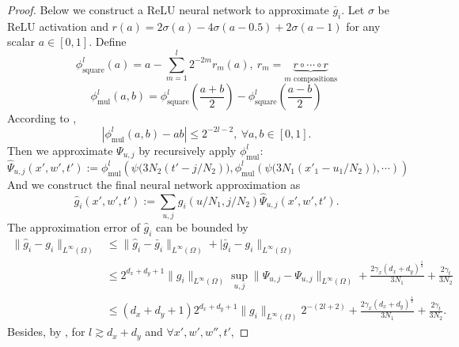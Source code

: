 \documentclass{article}
\numberwithin{equation}{section}
\theoremstyle{definition}
\begin{document}
\begin{proof}
    Below we construct a ReLU neural network to approximate $\bar{g}_i$.
    Let $\sigma$ be ReLU activation and $r(a)=2\sigma(a)-4\sigma(a-0.5)+2\sigma(a-1)$ for any scalar $a\in[0,1]$.
    Define
    \begin{equation}
        \phi_{\text{square}}^l(a)=a-\sum_{m=1}^l2^{-2m}r_m(a),\ r_m=\underbrace{r\circ\cdots\circ r}_{m \text{ compositions}}
    \end{equation}
    \begin{equation}
        \phi_{\text{mul}}^l(a,b)=\phi_{\text{square}}^l(\frac{a+b}{2})-\phi_{\text{square}}^l(\frac{a-b}{2})
    \end{equation}
    According to \citet{yarotsky2017error}, 
    \begin{equation}
        |\phi_{\text{mul}}^l(a,b)-ab|\leq 2^{-2l-2},\ \forall a,b\in[0,1].
    \end{equation}
    Then we approximate $\Psi_{u,j}$ by recursively apply $\phi_{\text{mul}}^l$:
    \begin{equation}\label{eq:def_Psi_hat}
        \widehat{\Psi}_{u,j}(x',w',t'):=\phi_{\text{mul}}^l\left(\psi\big(3N_2(t'-j/N_2)\big),\phi_{\text{mul}}^l\left(\psi\big(3N_1(x'_1-u_1/N_2)\big),\cdots\right)\right)
    \end{equation}
    And we construct the final neural network approximation as
    \begin{equation}\label{eq:def_g_hat}
        \widehat{g}_i(x',w',t'):=\sum_{u,j}g_i(u/N_1,j/N_2)\widehat{\Psi}_{u,j}(x',w',t').
    \end{equation}
    The approximation error of $\widehat{g}_i$ can be bounded by
    \begin{equation}
        \begin{aligned}
            \|\widehat{g}_i-g_i\|_{L^\infty(\Omega)}
            &\leq \|\widehat{g}_i-\bar{g}_i\|_{L^\infty(\Omega)}+|\bar{g}_i-g_i\|_{L^\infty(\Omega)} \\
            &\leq 2^{d_x+d_y+1}\|g_i\|_{L^\infty(\Omega)}\sup_{u,j}\|\widehat{\Psi}_{u,j}-\Psi_{u,j}\|_{L^\infty(\Omega)}+\frac{2\gamma_x(d_x+d_y)^{\frac{1}{2}}}{3N_1}+\frac{2\gamma_t}{3N_2} \\
            &\leq (d_x+d_y+1)2^{d_x+d_y+1}\|g_i\|_{L^\infty(\Omega)}2^{-(2l+2)}+\frac{2\gamma_x(d_x+d_y)^{\frac{1}{2}}}{3N_1}+\frac{2\gamma_t}{3N_2}.
        \end{aligned}
    \end{equation}
    Besides, by \citet[Lemma 15]{chen2020distribution}, for $l\gtrsim d_x+d_y$ and $\forall x',w',w'',t'$,

\end{proof}
\end{document}
